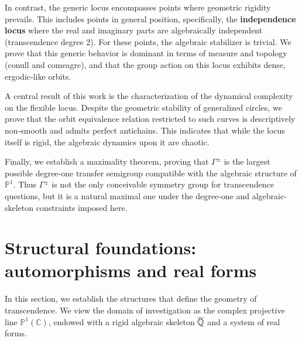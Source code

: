 In contrast, the generic locus encompasses points where geometric rigidity prevails. This includes points in general position, specifically, the \textbf{independence locus} where the real and imaginary parts are algebraically independent (transcendence degree 2). For these points, the algebraic stabilizer is trivial. We prove that this generic behavior is dominant in terms of measure and topology (conull and comeagre), and that the group action on this locus exhibits dense, ergodic-like orbits.

A central result of this work is the characterization of the dynamical complexity on the flexible locus. Despite the geometric stability of generalized circles, we prove that the orbit equivalence relation restricted to such curves is descriptively non-smooth and admits perfect antichains. This indicates that while the locus itself is rigid, the algebraic dynamics upon it are chaotic.

Finally, we establish a maximality theorem, proving that $\Gamma^{\pm}$ is the largest possible degree-one transfer semigroup compatible with the algebraic structure of $\mathbb{P}^1$. Thus $\Gamma^{\pm}$ is not the only conceivable symmetry group for transcendence questions, but it is a natural maximal one under the degree-one and algebraic-skeleton constraints imposed here.


\section{Structural foundations: automorphisms and real forms}\label{grct:sec:defining-domain}
In this section, we establish the structures that define the geometry of transcendence. We view the domain of investigation as the complex projective line $\mathbb{P}^1(\mathbb{C})$, endowed with a rigid algebraic skeleton $\overline{\mathbb{Q}}$ and a system of real forms.

